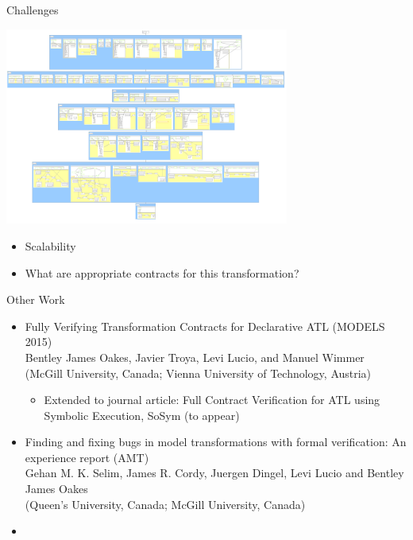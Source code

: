 \documentclass[xcolor=dvipsnames, 12pt, handout]{beamer}
\begin{document}
\begin{frame}{Challenges}

\begin{center}
\includegraphics[width=0.7\textwidth]{figures/mbeddr}
\end{center}

\begin{itemize}
\item Scalability
\item What are appropriate contracts for this transformation?

\end{itemize}
\end{frame}

\begin{frame}{Other Work}
\small
\begin{itemize}[<+->]

\item Fully Verifying Transformation Contracts for Declarative ATL (MODELS 2015)\\

Bentley James Oakes, Javier Troya, Levi Lucio, and Manuel Wimmer\\
(McGill University, Canada; Vienna University of Technology, Austria)
\begin{itemize}
\item Extended to journal article: Full Contract Verification for ATL using Symbolic Execution, SoSym (to appear)
\end{itemize}
\item  Finding and fixing bugs in model transformations with formal verification: An experience report (AMT)\\
Gehan M. K. Selim, James R. Cordy, Juergen Dingel, Levi Lucio and Bentley James Oakes\\
(Queen's University, Canada; McGill University, Canada) 
\item 
\end{itemize}
\end{frame}
\end{document}
